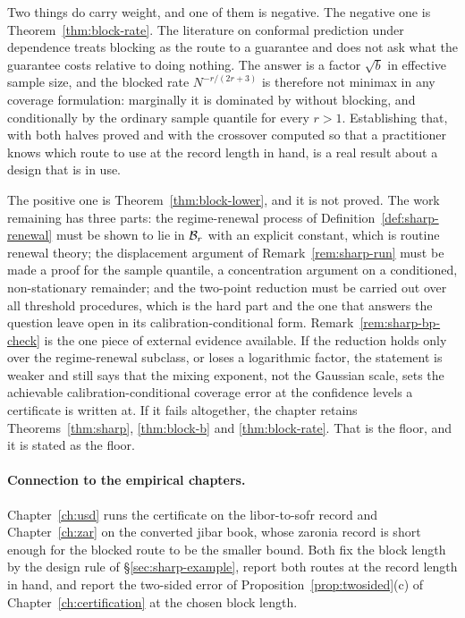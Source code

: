 \documentclass[../../../main.tex]{subfiles}
\begin{document}
Two things do carry weight, and one of them is negative. The negative one is Theorem~\ref{thm:block-rate}. The literature on conformal prediction under dependence treats blocking as the route to a guarantee and does not ask what the guarantee costs relative to doing nothing. The answer is a factor $\sqrt{b}$ in effective sample size, and the blocked rate $N^{-r/(2r+3)}$ is therefore not minimax in any coverage formulation: marginally it is dominated by \citet[Cor.~2]{barber2026} without blocking, and conditionally by the ordinary sample quantile for every $r>1$. Establishing that, with both halves proved and with the crossover computed so that a practitioner knows which route to use at the record length in hand, is a real result about a design that is in use.

The positive one is Theorem~\ref{thm:block-lower}, and it is not proved. The work remaining has three parts: the regime-renewal process of Definition~\ref{def:sharp-renewal} must be shown to lie in $\mathcal B_{r}$ with an explicit constant, which is routine renewal theory; the displacement argument of Remark~\ref{rem:sharp-run} must be made a proof for the sample quantile, a concentration argument on a conditioned, non-stationary remainder; and the two-point reduction must be carried out over all threshold procedures, which is the hard part and the one that answers the question \citet[Sec.~4]{barber2026} leave open in its calibration-conditional form. Remark~\ref{rem:sharp-bp-check} is the one piece of external evidence available. If the reduction holds only over the regime-renewal subclass, or loses a logarithmic factor, the statement is weaker and still says that the mixing exponent, not the Gaussian scale, sets the achievable calibration-conditional coverage error at the confidence levels a certificate is written at. If it fails altogether, the chapter retains Theorems~\ref{thm:sharp}, \ref{thm:block-b} and \ref{thm:block-rate}. That is the floor, and it is stated as the floor.

\paragraph{Connection to the empirical chapters.} Chapter~\ref{ch:usd} runs the certificate on the \gls{libor}-to-\gls{sofr} record and Chapter~\ref{ch:zar} on the converted \gls{jibar} book, whose \gls{zaronia} record is short enough for the blocked route to be the smaller bound. Both fix the block length by the design rule of \S\ref{sec:sharp-example}, report both routes at the record length in hand, and report the two-sided error of Proposition~\ref{prop:twosided}(c) of Chapter~\ref{ch:certification} at the chosen block length.
\end{document}
